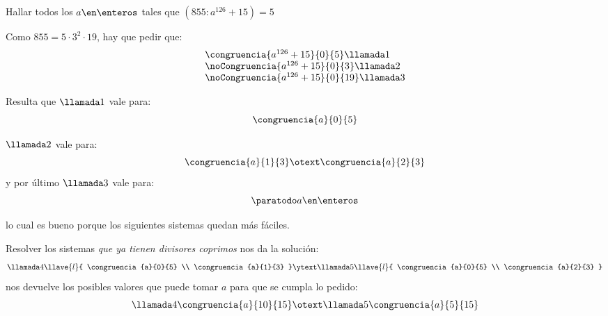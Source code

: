 \begin{enunciado}{\ejExtra}
	Hallar todos los $a \en \enteros$ tales que $(855 : a^{126} + 15) = 5$
\end{enunciado}

Como $855 = 5\cdot 3^2 \cdot 19$, hay que pedir que:
$$
	\begin{array}{l}
		\congruencia{a^{126} + 15}{0}{5}  \llamada1  \\
		\noCongruencia{a^{126} + 15}{0}{3} \llamada2 \\
		\noCongruencia{a^{126} + 15}{0}{19}\llamada3
	\end{array}
$$

Resulta que $\llamada1$ vale para:
$$
	\congruencia{a}{0}{5}
$$

$\llamada2$ vale para:
$$
	\congruencia{a}{1}{3}
	\otext
	\congruencia{a}{2}{3}
$$
y por último $\llamada3$ vale para:
$$
\paratodo a \en \enteros
$$

lo cual es bueno porque los siguientes sistemas quedan más fáciles.

\bigskip

Resolver los sistemas \textit{que ya tienen divisores coprimos} nos da la solución:
$$
\llamada4
\llave{l}{
 \congruencia{a}{0}{5}  \\
 \congruencia{a}{1}{3}
}
\ytext
\llamada5
\llave{l}{
 \congruencia{a}{0}{5}  \\
 \congruencia{a}{2}{3}
}
$$
nos devuelve los posibles valores que puede tomar $a$ para que se cumpla lo pedido:
$$
\llamada4
\congruencia{a}{10}{15} 
\otext
\llamada5
\congruencia{a}{5}{15} 
$$

\begin{aportes}
  \item {}
\end{aportes}

